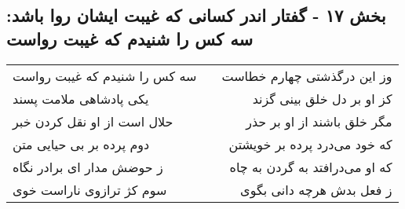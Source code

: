 \begin{center}
\section*{بخش ۱۷ - گفتار اندر کسانی که غیبت ایشان روا باشد: سه کس را شنیدم که غیبت رواست}
\label{sec:017}
\begin{longtable}{l p{0.5cm} r}
سه کس را شنیدم که غیبت رواست
&&
وز این درگذشتی چهارم خطاست
\\
یکی پادشاهی ملامت پسند
&&
کز او بر دل خلق بینی گزند
\\
حلال است از او نقل کردن خبر
&&
مگر خلق باشند از او بر حذر
\\
دوم پرده بر بی حیایی متن
&&
که خود می‌درد پرده بر خویشتن
\\
ز حوضش مدار ای برادر نگاه
&&
که او می‌درافتد به گردن به چاه
\\
سوم کژ ترازوی ناراست خوی
&&
ز فعل بدش هرچه دانی بگوی
\\
\end{longtable}
\end{center}
